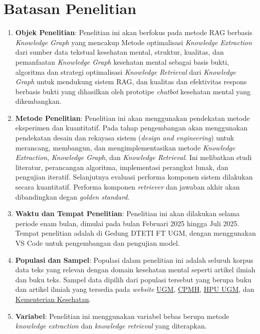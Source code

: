 \section{Batasan Penelitian}
\begin{enumerate}
	\item \textbf{Objek Penelitian}: Penelitian ini akan berfokus pada metode RAG berbasis \textit{Knowledge Graph} yang mencakup
	      Metode optimalisasi \textit{Knowledge Extraction} dari sumber data tekstual kesehatan mental,
	      struktur, kualitas, dan pemanfaatan \textit{Knowledge Graph} kesehatan mental sebagai basis bukti,
	      algoritma dan strategi optimalisasi \textit{Knowledge Retrieval} dari \textit{Knowledge Graph} untuk mendukung sistem RAG, dan
	      kualitas dan efektivitas respons berbasis bukti yang dihasilkan oleh prototipe \textit{chatbot} kesehatan mental yang dikembangkan.
	\item \textbf{Metode Penelitian}: Penelitian ini akan menggunakan pendekatan metode eksperimen dan kuantitatif.
	      Pada tahap pengembangan akan menggunakan pendekatan desain dan rekayasa sistem (\textit{design and engineering}) untuk merancang, membangun, dan mengimplementasikan metode \textit{Knowledge Extraction}, \textit{Knowledge Graph}, dan \textit{Knowledge Retrieval}.
	      Ini melibatkan studi literatur, perancangan algoritma, implementasi perangkat lunak, dan pengujian iteratif.
	      Selanjutnya evaluasi performa komponen sistem dilakukan secara kuantitatif.
	      Performa komponen \textit{retriever} dan jawaban akhir akan dibandingkan degan \textit{golden standard}.
	\item \textbf{Waktu dan Tempat Penelitian}: Penelitian ini akan dilakukan selama periode enam bulan, dimulai pada bulan Februari 2025 hingga Juli 2025. Tempat penelitian adalah di Gedung DTETI FT UGM, dengan menggunakan VS Code untuk pengembangan dan pengujian model.
	\item	\textbf{Populasi dan Sampel}: Populasi dalam penelitian ini adalah seluruh korpus data teks yang relevan dengan domain kesehatan mental seperti artikel ilmiah dan buku teks.
	      Sampel data dipilih dari populasi tersebut yang berupa buku dan artikel ilmiah yang tersedia pada \textit{website} \href{https://ugm.ac.id/}{UGM}, \href{https://cpmh.psikologi.ugm.ac.id/}{CPMH}, \href{https://hpu.ugm.ac.id}{HPU UGM}, dan \href{https://repository.kemkes.go.id/}{Kementerian Kesehatan}.
	\item	\textbf{Variabel}: Penelitian ini menggunakan variabel bebas berupa metode \textit{knowledge extraction} dan \textit{knowledge retrieval} yang diterapkan.

\end{enumerate}
